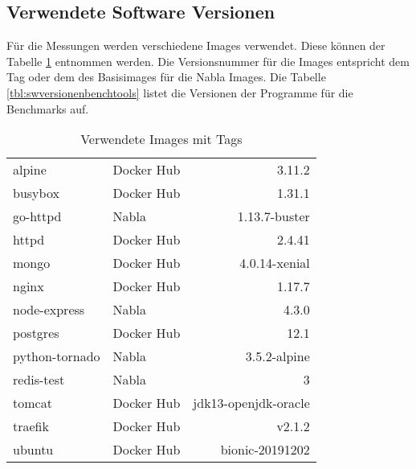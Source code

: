 \subsection{Verwendete Software Versionen}

Für die Messungen werden verschiedene Images verwendet. Diese können der Tabelle \ref{tbl:swversionenimages} entnommen werden. Die Versionsnummer für die Images entspricht dem Tag oder dem des Basisimages für die Nabla Images. Die Tabelle \ref{tbl:swversionenbenchtools} listet die Versionen der Programme für die Benchmarks auf.

\begin{table}[ht]
	\begin{threeparttable}
		\myfloatalign
		\small
		\begin{tabularx}{\textwidth}{Xlr} \hline
			\spacedlowsmallcaps{Name} & \spacedlowsmallcaps{Quelle} & \spacedlowsmallcaps{Version}\\ \hline
			alpine         & Docker Hub & 3.11.2               \\
			busybox        & Docker Hub & 1.31.1               \\
			go-httpd       & Nabla      & 1.13.7-buster        \\
			httpd          & Docker Hub & 2.4.41               \\
			mongo          & Docker Hub & 4.0.14-xenial        \\
			nginx          & Docker Hub & 1.17.7               \\
			node-express   & Nabla      & 4.3.0                \\
			postgres       & Docker Hub & 12.1                 \\
			python-tornado & Nabla      & 3.5.2-alpine         \\
			redis-test     & Nabla      & 3                    \\
			tomcat         & Docker Hub & jdk13-openjdk-oracle \\
			traefik        & Docker Hub & v2.1.2               \\
			ubuntu         & Docker Hub & bionic-20191202     \\ \hline
		\end{tabularx}
	\end{threeparttable}
	\caption{Verwendete Images mit Tags}
	\label{tbl:swversionenimages}
\end{table}

